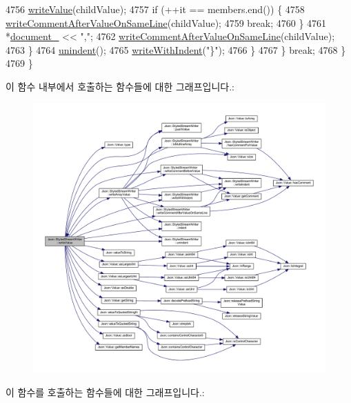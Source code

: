 \begin{DoxyCode}
4756         \hyperlink{class_json_1_1_styled_stream_writer_a4359250e09273fa0144021684be001ae}{writeValue}(childValue);
4757         \textcolor{keywordflow}{if} (++it == members.end()) \{
4758           \hyperlink{class_json_1_1_styled_stream_writer_ad2ca860e317ca91d6b2932535b4ce9c7}{writeCommentAfterValueOnSameLine}(childValue);
4759           \textcolor{keywordflow}{break};
4760         \}
4761         *\hyperlink{class_json_1_1_styled_stream_writer_aa8c4e4576f5c3dcb10955d133a092dd6}{document\_} << \textcolor{stringliteral}{","};
4762         \hyperlink{class_json_1_1_styled_stream_writer_ad2ca860e317ca91d6b2932535b4ce9c7}{writeCommentAfterValueOnSameLine}(childValue);
4763       \}
4764       \hyperlink{class_json_1_1_styled_stream_writer_a74d8fb9beecd29759d7b79f430386358}{unindent}();
4765       \hyperlink{class_json_1_1_styled_stream_writer_a4e64789373b359c9b7a7244509b918fc}{writeWithIndent}(\textcolor{stringliteral}{"\}"});
4766     \}
4767   \} \textcolor{keywordflow}{break};
4768   \}
4769 \}
\end{DoxyCode}
이 함수 내부에서 호출하는 함수들에 대한 그래프입니다.\+:
\nopagebreak
\begin{figure}[H]
\begin{center}
\leavevmode
\includegraphics[width=350pt]{class_json_1_1_styled_stream_writer_a4359250e09273fa0144021684be001ae_cgraph}
\end{center}
\end{figure}
이 함수를 호출하는 함수들에 대한 그래프입니다.\+:\nopagebreak
